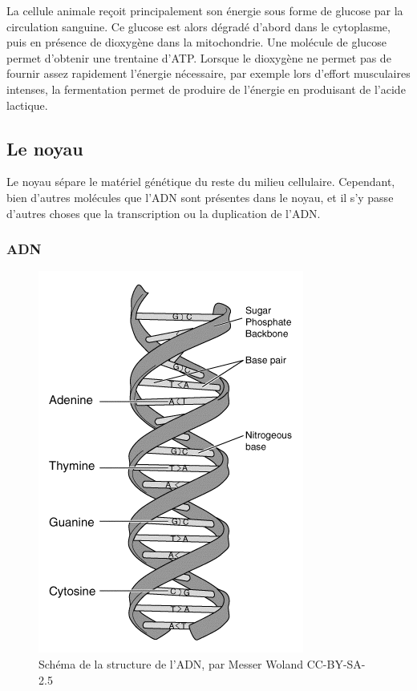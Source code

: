 La cellule animale reçoit principalement son énergie sous forme de glucose par la circulation sanguine. Ce glucose est alors dégradé d'abord dans le cytoplasme, puis en présence de dioxygène dans la mitochondrie. 
Une molécule de glucose permet d'obtenir une trentaine d'ATP. 
Lorsque le dioxygène ne permet pas de fournir assez rapidement l'énergie nécessaire, par exemple lors d'effort musculaires intenses, la fermentation permet de produire de l'énergie en produisant de l'acide lactique. 

\subsection{Le noyau}

Le noyau sépare le matériel génétique du reste du milieu cellulaire. Cependant, bien d'autres molécules que l'ADN sont présentes dans le noyau, et il s'y passe d'autres choses que la transcription ou la duplication de l'ADN. 

\subsubsection{ADN}

\begin{figure}
\includegraphics[scale=0.3]{ADN.png}
\caption{Schéma de la structure de l'ADN, par Messer Woland CC-BY-SA-2.5}
\end{figure}

